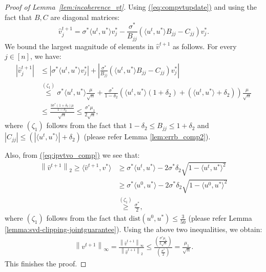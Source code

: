 \documentclass[11pt]{article}
\renewcommand{\eqref}[1]{\hyperref[#1]{(\ref*{#1})}}
\theoremstyle{plain}
\theoremstyle{definition}
\newcommand{\dist}{\mathrm{dist}}
\newcommand{\twonorm}[1]{\left\| {#1} \right\|_2}
\newcommand{\infnorm}[1]{\left\| {#1} \right\|_{\infty}}
\newcommand{\E}{\mathbb{E}}
\newcommand{\so}{\sigma^*}
\newcommand{\ut}{u^t}
\newcommand{\uo}{u^* }
\newcommand{\vo}{v^* }
\newcommand{\ip}[2]{\langle #1, #2 \rangle}
\begin{document}
\begin{proof}[Proof of Lemma~\ref{lem:incoherence_vt}]
Using \eqref{eq:compvtupdate} and using the fact that $B, C$ are diagonal matrices:
$$\widehat{v}^{t+1}_j=\so\ip{\ut}{\uo}\vo_j-\frac{\so}{B_{jj}} \left(\ip{\ut}{\uo}B_{jj}-C_{jj}\right)\vo_j.$$%
We bound the largest magnitude of elements in $\widehat{v}^{t+1}$ as follows. For every $j\in[n]$, we have:
\begin{align*}
  \left|\widehat{v}^{t+1}_j\right| &\leq \left|\so\ip{\ut}{\uo}\vo_j\right| + \left|\frac{\so}{B_{jj}} \left(\ip{\ut}{\uo}B_{jj}-C_{jj}\right)\vo_j\right| \\
	&\stackrel{(\zeta_1)}{\leq} \so \ip{\ut}{\uo} \frac{\mu}{\sqrt{n}} + \frac{\so}{1-\delta_2} \left(\ip{\ut}{\uo} \left(1+\delta_2\right) + \left(\ip{\ut}{\uo}+\delta_2\right)\right) \frac{\mu}{\sqrt{n}} \\
	&\leq \frac{\frac{3\so(1+\delta_2)\mu}{1-\delta_2}}{\sqrt{n}} \leq \frac{\so\mu_1}{2\sqrt{n}},
\end{align*}
where $(\zeta_1)$ follows from the fact that $1-\delta_2 \leq B_{jj} \leq 1+\delta_2$ and $\left|C_{jj}\right| \leq \left(\left|\ip{\ut}{\uo}\right|+\delta_2\right)$ (please refer Lemma \ref{lem:errb_comp2}).

Also, from \eqref{eq:ipvtvo_comp} we see that:
\begin{align*}
  \twonorm{\widehat{v}^{t+1}} \geq \ip{\widehat{v}^{t+1}}{\vo} &\geq \so\ip{\ut}{\uo}-2\so\delta_2\sqrt{1-\ip{\ut}{\uo}^2} \\
	&\geq \so\ip{u^0}{\uo}-2\so\delta_2\sqrt{1-\ip{u^0}{\uo}^2} \\
	&\stackrel{(\zeta_1)}{\geq} \frac{\so}{2},
\end{align*}
where $(\zeta_1)$ follows from the fact that $\dist\left(u^0,u^*\right) \leq \frac{3}{50}$ (please refer Lemma \ref{lemma:svd-clipping-jointguarantee}).
Using the above two inequalities, we obtain:
\begin{align*}
  \infnorm{v^{t+1}} = \frac{\infnorm{\widehat{v}^{t+1}}}{\twonorm{\widehat{v}^{t+1}}} \leq \frac{\left(\frac{\so\mu_1}{2\sqrt{n}}\right)}{\left(\frac{\so}{2}\right)}
	= \frac{\mu_1}{\sqrt{n}}.
\end{align*}
This finishes the proof.
\end{proof}
\end{document}
